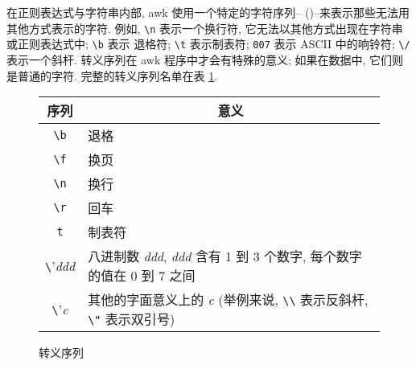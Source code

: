 在正则表达式与字符串内部, awk 使用一个特定的字符序列--{}
(){}--来表示那些无法用其他方式表示的字符. 例如,
\verb'\n'
表示一个换行符, 它无法以其他方式出现在字符串或正则表达式中; \verb'\b' 表示
退格符; \verb'\t' 表示制表符; \verb'007' 表示 ASCII 中的响铃符; \verb'\/'
表示一个斜杆. 转义序列在 awk 程序中才会有特殊的意义; 如果在数据中, 它们则
是普通的字符. 完整的转义序列名单在表 \ref{tbl:escape_sequences}.
\begin{figure}[ht]
\captionsetup{type=table}
\caption{转义序列}
\label{tbl:escape_sequences}
\begin{center}
\begin{tabular}{c|l}
    \hline
    \hline
    序列        &  \multicolumn{1}{c}{意义}  \\
    \hline
    \verb'\b'   & 退格  \\
    \verb'\f'   & 换页  \\
    \verb'\n'   & 换行 \\
    \verb'\r'   & 回车 \\
    \verb't'    & 制表符    \\
    \verb'\'\textit{ddd} & 八进制数 \textit{ddd}, \textit{ddd}
        含有 1 到 3 个数字, 每个数字的值在 0 到 7 之间 \\
    \verb'\'\textit{c} & 其他的字面意义上的 \textit{c}
        (举例来说, \verb'\\' 表示反斜杆, \verb'\"' 表示双引号) \\
    \hline
\end{tabular}
\end{center}
\end{figure}

